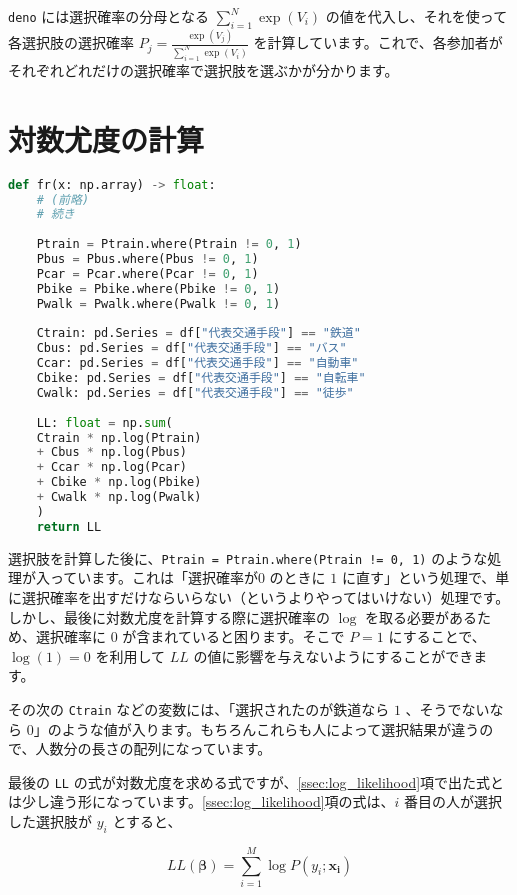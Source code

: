 \lstinline{deno} には選択確率の分母となる $\sum_{i=1}^N \exp(V_i)$ の値を代入し、それを使って各選択肢の選択確率 $P_j=\frac{\exp(V_j)}{\sum_{i=1}^N \exp(V_i)}$ を計算しています。これで、各参加者がそれぞれどれだけの選択確率で選択肢を選ぶかが分かります。

    \section{対数尤度の計算}

    \begin{lstlisting}[language=Python]
def fr(x: np.array) -> float:
    # (前略)
    # 続き
    
    Ptrain = Ptrain.where(Ptrain != 0, 1)
    Pbus = Pbus.where(Pbus != 0, 1)
    Pcar = Pcar.where(Pcar != 0, 1)
    Pbike = Pbike.where(Pbike != 0, 1)
    Pwalk = Pwalk.where(Pwalk != 0, 1)
    
    Ctrain: pd.Series = df["代表交通手段"] == "鉄道"
    Cbus: pd.Series = df["代表交通手段"] == "バス"
    Ccar: pd.Series = df["代表交通手段"] == "自動車"
    Cbike: pd.Series = df["代表交通手段"] == "自転車"
    Cwalk: pd.Series = df["代表交通手段"] == "徒歩"
    
    LL: float = np.sum(
    Ctrain * np.log(Ptrain)
    + Cbus * np.log(Pbus)
    + Ccar * np.log(Pcar)
    + Cbike * np.log(Pbike)
    + Cwalk * np.log(Pwalk)
    )
    return LL
\end{lstlisting}


    選択肢を計算した後に、\lstinline{Ptrain = Ptrain.where(Ptrain != 0, 1)} のような処理が入っています。これは「選択確率が$0$ のときに $1$ に直す」という処理で、単に選択確率を出すだけならいらない（というよりやってはいけない）処理です。しかし、最後に対数尤度を計算する際に選択確率の $\log$ を取る必要があるため、選択確率に $0$ が含まれていると困ります。そこで $P=1$ にすることで、 $\log(1)=0$ を利用して $LL$ の値に影響を与えないようにすることができます。

    その次の \lstinline{Ctrain} などの変数には、「選択されたのが鉄道なら $1$ 、そうでないなら $0$」のような値が入ります。もちろんこれらも人によって選択結果が違うので、人数分の長さの配列になっています。

    最後の \lstinline{LL} の式が対数尤度を求める式ですが、\ref{ssec:log_likelihood}項で出た式とは少し違う形になっています。\ref{ssec:log_likelihood}項の式は、$i$ 番目の人が選択した選択肢が $y_i$ とすると、

    \begin{equation}
        LL(\boldsymbol\beta) = \sum_{i=1}^M \log P(y_i;\boldsymbol{x_i})
    \end{equation}

